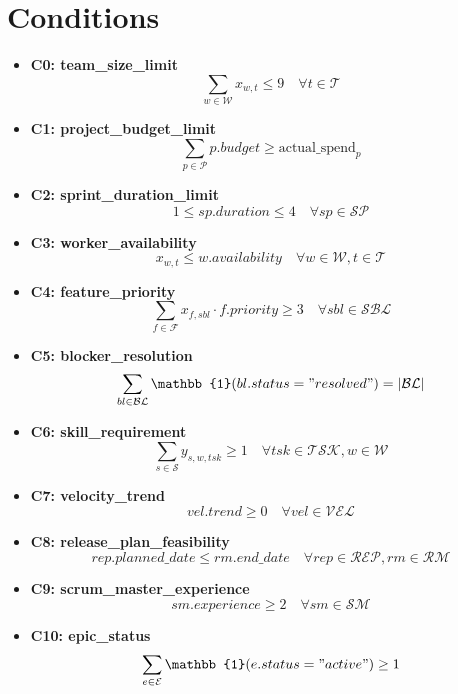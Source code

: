 \documentclass{article}
\begin{document}
\section{Conditions}
\begin{itemize}
    \item \textbf{C0: team\_size\_limit}
    \[
    \sum_{w \in \mathcal{W}} x_{w,t} \leq 9 \quad \forall t \in \mathcal{T}
    \]
    \item \textbf{C1: project\_budget\_limit}
    \[
    \sum_{p \in \mathcal{P}} p.budget \geq \text{actual\_spend}_p
    \]
    \item \textbf{C2: sprint\_duration\_limit}
    \[
    1 \leq sp.duration \leq 4 \quad \forall sp \in \mathcal{SP}
    \]
    \item \textbf{C3: worker\_availability}
    \[
    x_{w,t} \leq w.availability \quad \forall w \in \mathcal{W}, t \in \mathcal{T}
    \]
    \item \textbf{C4: feature\_priority}
    \[
    \sum_{f \in \mathcal{F}} x_{f,sbl} \cdot f.priority \geq 3 \quad \forall sbl \in \mathcal{SBL}
    \]
    \item \textbf{C5: blocker\_resolution}
    \[
    \sum_{bl \in \mathcal{BL}} \mathbb{1}(bl.status = "resolved") = |\mathcal{BL}|
    \]
    \item \textbf{C6: skill\_requirement}
    \[
    \sum_{s \in \mathcal{S}} y_{s,w,tsk} \geq 1 \quad \forall tsk \in \mathcal{TSK}, w \in \mathcal{W}
    \]
    \item \textbf{C7: velocity\_trend}
    \[
    vel.trend \geq 0 \quad \forall vel \in \mathcal{VEL}
    \]
    \item \textbf{C8: release\_plan\_feasibility}
    \[
    rep.planned\_date \leq rm.end\_date \quad \forall rep \in \mathcal{REP}, rm \in \mathcal{RM}
    \]
    \item \textbf{C9: scrum\_master\_experience}
    \[
    sm.experience \geq 2 \quad \forall sm \in \mathcal{SM}
    \]
    \item \textbf{C10: epic\_status}
    \[
    \sum_{e \in \mathcal{E}} \mathbb{1}(e.status = "active") \geq 1
    \]
\end{itemize}
\end{document}
